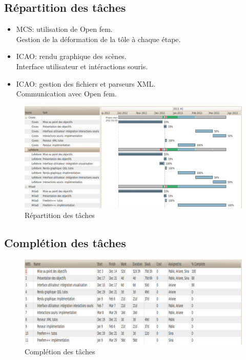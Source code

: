 \documentclass{beamer}
\begin{document}
\subsection{Répartition des tâches}
\begin{frame}
    \begin{itemize}
        \item MCS: utilisation de Open fem.\\
            Gestion de la déformation de la tôle à chaque étape.
        \item ICAO: rendu graphique des scènes.\\
            Interface utilisateur et intéractions souris.
        \item ICAO: gestion des fichiers et parseurs XML.\\
            Communication avec Open fem.
    \end{itemize}
\end{frame}
\begin{frame}
    \begin{figure}
        \includegraphics[width=\textwidth]{img/ganttRepartition.png}
        \caption{Répartition des tâches}
        \label{Répartition}
    \end{figure}
\end{frame}
\subsection{Complétion des tâches}
\begin{frame}
    \begin{figure}
        \includegraphics[width=\textwidth]{img/ganttCompletionTasks.png}
        \caption{Complétion des tâches}
        \label{Complétion}
    \end{figure}
\end{frame}
\end{document}

